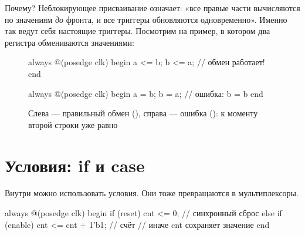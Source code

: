 Почему? Неблокирующее присваивание \code{<=} означает: «все правые части
вычисляются по значениям \emph{до} фронта, и все триггеры обновляются
одновременно». Именно так ведут себя настоящие триггеры. Посмотрим на
пример, в котором два регистра обмениваются значениями:

\begin{figure}[H]
\centering
\begin{minipage}{0.47\textwidth}
\begin{vcode}
always @(posedge clk) begin
    a <= b;
    b <= a;   // обмен работает!
end
\end{vcode}
\centering
{}
\end{minipage}\hfill
\begin{minipage}{0.47\textwidth}
\begin{vcode}
always @(posedge clk) begin
    a = b;
    b = a;    // ошибка: b = b
end
\end{vcode}
\centering
{}
\end{minipage}
\caption{Слева --- правильный обмен (\code{<=}), справа --- ошибка (\code{=}):
к моменту второй строки  уже равно }
\end{figure}

\section{Условия: if и case}

Внутри  можно использовать условия. Они тоже превращаются в
мультиплексоры.
\begin{vcode}
always @(posedge clk) begin
    if (reset)
        cnt <= 0;               // синхронный сброс
    else if (enable)
        cnt <= cnt + 1'b1;      // счёт
    // иначе cnt сохраняет значение
end
\end{vcode}

